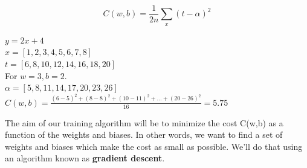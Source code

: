 \documentclass[10pt, compress]{beamer}
\begin{document}
\begin{frame}

  $$ C(w, b) = \frac{1}{2n}\sum_x (t-\alpha)^2$$

  $ y = 2x + 4$ \\
  $x = [1, 2, 3, 4, 5, 6, 7, 8]$ \\
  $t = [6, 8, 10, 12, 14, 16, 18, 20]$ \\

  For $w = 3, b = 2$. \\
  $\alpha = [5, 8, 11, 14, 17, 20, 23, 26]$ \\ \hfill \break
  $C(w, b) = \frac{(6-5)^2 + (8-8)^2 + (10-11)^2 + ... + (20-26)^2}{16} = 5.75$ \\ \hfill \break

  The aim of our training algorithm will be to minimize the cost C(w,b) as a function of the weights and biases. In other words, we want to find a set of weights and biases which make the cost as small as possible. We'll do that using an algorithm known as \textbf{gradient descent}.
\end{frame}
\end{document}
